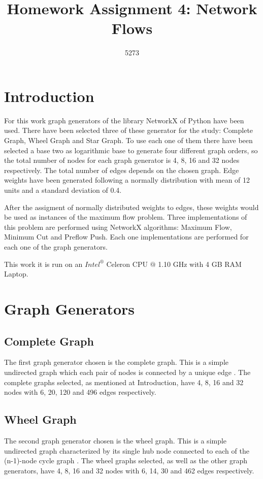 \documentclass[10pt,a4paper,openany]{article}
\author{5273}
\title{Homework Assignment 4: Network Flows}
\date{}
\begin{document}
	
\maketitle

	\section*{Introduction}
	
	For this work graph generators of the library NetworkX of Python have been used. There have been selected three of these generator for the study: Complete Graph, Wheel Graph and Star Graph. To use each one of them there have been selected a base two as logarithmic base to generate four different graph orders, so the total number of nodes for each graph generator is 4, 8, 16 and 32 nodes respectively. The total number of edges depends on the chosen graph. Edge weights have been generated following a normally distribution with mean of 12 units and a standard deviation of 0.4. 
	
	After the assigment of normally distributed weights to edges, these weights would be used as instances of the maximum flow problem. Three implementations of this problem are performed using NetworkX algorithms: Maximum Flow, Minimum Cut and Preflow Push. Each one implementations are performed for each one of the graph generators.
	
	This work it is run on an $Intel^{\circledR} $ Celeron CPU $ @ $ 1.10 GHz with 4 GB RAM Laptop.
	
	\section*{Graph Generators}
	\subsection*{Complete Graph}
	 
	The first graph generator chosen is the complete graph. This is a simple undirected graph which each pair of nodes is connected by a unique edge \citep{erdos1959graph}. The complete graphs selected, as mentioned at Introduction, have 4, 8, 16 and 32 nodes with 6, 20, 120 and 496 edges respectively.
	
	\subsection*{Wheel Graph}
	The second graph generator chosen is the wheel graph. This is a simple undirected graph characterized by its single hub node connected to each of the (n-1)-node cycle graph \citep{networkx}. The wheel graphs selected, as well as the other graph generators, have 4, 8, 16 and 32 nodes with 6, 14, 30 and 462 edges respectively.
	
\end{document}
